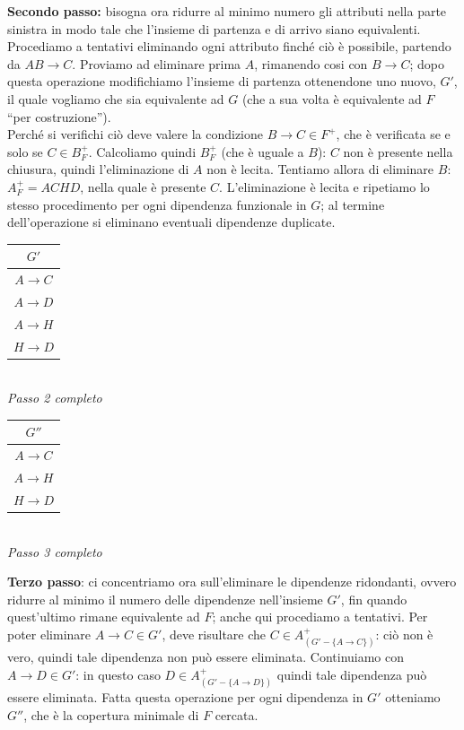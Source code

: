 \begin{exmp}
\noindent \textbf{Secondo passo:} bisogna ora ridurre al minimo numero gli attributi nella parte sinistra in modo tale che l'insieme di partenza
e di arrivo siano equivalenti. Procediamo a tentativi eliminando ogni attributo finché ciò è possibile, partendo da $AB\rightarrow C$. Proviamo 
ad eliminare prima $A$, rimanendo cosi con $B\rightarrow C$; dopo questa operazione modifichiamo l'insieme di partenza ottenendone
uno nuovo, $G'$, il quale vogliamo che sia equivalente ad $G$ (che a sua volta è equivalente ad $F$ ``per costruzione'').\\
Perché si verifichi ciò deve valere la condizione $B\rightarrow C \in F^+$, che è verificata se e solo se $C \in B^+_F$.
Calcoliamo quindi $B^+_F$ (che è uguale a $B$): $C$ non è presente nella chiusura, quindi l'eliminazione di $A$ non è 
lecita. Tentiamo allora di eliminare $B$: $A^+_F=ACHD$, nella quale è presente $C$. L'eliminazione è lecita e ripetiamo lo stesso
procedimento per ogni dipendenza funzionale in $G$; al termine dell'operazione si eliminano eventuali dipendenze duplicate.
\begin{multicols}{2}
\begin{multicols}{2}
\begin{tabular}{|c|}
  \hline
  $G'$\\
  \hline
  $A\rightarrow C$\\
  $A\rightarrow D$\\
  $A\rightarrow H$\\
  $H\rightarrow D$\\
  \hline
 \end{tabular}\\
 
 \emph{\small Passo 2 completo}\\
 
 \begin{tabular}{|c|}
  \hline
  $G''$\\
  \hline
  $A\rightarrow C$\\
  $A\rightarrow H$\\
  $H\rightarrow D$\\
  \hline
 \end{tabular}\\
 
 \emph{\small Passo 3 completo}\\
\end{multicols}
\end{multicols}

\noindent \textbf{Terzo passo}: ci concentriamo ora sull'eliminare le dipendenze ridondanti, ovvero ridurre al minimo il numero
delle dipendenze nell'insieme $G'$, fin quando quest'ultimo rimane equivalente ad $F$; anche qui procediamo a tentativi. Per poter
eliminare $A\rightarrow C \in G'$, deve risultare che $C \in A^+_{(G'-\{A\rightarrow C\})}$: ciò non è vero, quindi tale dipendenza
non può essere eliminata. Continuiamo con $A\rightarrow D \in G'$: in questo caso $D \in A^+_{(G'-\{A\rightarrow D\})}$ quindi tale 
dipendenza può essere eliminata. Fatta questa operazione per ogni dipendenza in $G'$ otteniamo $G''$, che è la copertura minimale di
$F$ cercata.
\end{exmp}


